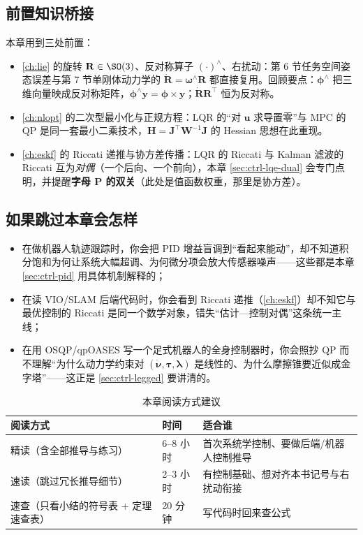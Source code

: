 \subsection*{前置知识桥接}
本章用到三处前置：
\begin{itemize}
  \item \cref{ch:lie} 的旋转 $\mathbf{R}\in\SO(3)$、反对称算子 $(\cdot)^\wedge$、右扰动：第 6 节任务空间姿态误差与第 7 节单刚体动力学的 $\dot{\mathbf{R}}=\boldsymbol{\omega}^\wedge\mathbf{R}$ 都直接复用。回顾要点：$\boldsymbol{\phi}^\wedge$ 把三维向量映成反对称矩阵，$\boldsymbol{\phi}^\wedge\mathbf{y}=\boldsymbol{\phi}\times\mathbf{y}$；$\dot{\mathbf{R}}\mathbf{R}^\top$ 恒为反对称。
  \item \cref{ch:nlopt} 的二次型最小化与正规方程：LQR 的“对 $\mathbf{u}$ 求导置零”与 MPC 的 QP 是同一套最小二乘技术，$\mathbf{H}=\mathbf{J}^\top\mathbf{W}^{-1}\mathbf{J}$ 的 Hessian 思想在此重现。
  \item \cref{ch:eskf} 的 Riccati 递推与协方差传播：LQR 的 Riccati 与 Kalman 滤波的 Riccati 互为\emph{对偶}（一个后向、一个前向），本章 \cref{sec:ctrl-lqe-dual} 会专门点明，并提醒\textbf{字母 $\mathbf{P}$ 的双关}（此处是值函数权重，那里是协方差）。
\end{itemize}

\subsection*{如果跳过本章会怎样}
\begin{itemize}
  \item 在做机器人轨迹跟踪时，你会把 PID 增益盲调到“看起来能动”，却不知道积分饱和为何让系统大幅超调、为何微分项会放大传感器噪声——这些都是本章 \cref{sec:ctrl-pid} 用具体机制解释的；
  \item 在读 VIO/SLAM 后端代码时，你会看到 Riccati 递推（\cref{ch:eskf}）却不知它与最优控制的 Riccati 是同一个数学对象，错失“估计—控制对偶”这条统一主线；
  \item 在用 OSQP/qpOASES 写一个足式机器人的全身控制器时，你会照抄 QP 而不理解“为什么动力学约束对 $(\dot{\boldsymbol{\nu}},\boldsymbol{\tau},\boldsymbol{\lambda})$ 是线性的、为什么摩擦锥要近似成金字塔”——这正是 \cref{sec:ctrl-legged} 要讲清的。
\end{itemize}

\begin{table}[H]\centering\small
\caption{本章阅读方式建议}
\label{tab:ctrl-reading}
\begin{tabular}{lll}
\toprule
阅读方式 & 时间 & 适合谁 \\
\midrule
精读（含全部推导与练习） & 6--8 小时 & 首次系统学控制、要做后端/机器人控制推导 \\
速读（跳过冗长推导细节） & 2--3 小时 & 有控制基础、想对齐本书记号与右扰动衔接 \\
速查（只看小结的符号表 + 定理速查表） & 20 分钟 & 写代码时回来查公式 \\
\bottomrule
\end{tabular}
\end{table}

